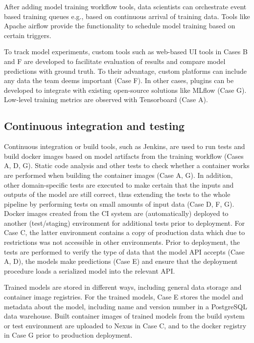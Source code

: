 
After adding model training workflow tools, data scientists can orchestrate event based training queues e.g., based on continuous arrival of training data.  Tools like Apache airflow provide the functionality to schedule model training based on certain triggers. %

To track model experiments, custom tools such as web-based UI tools in Cases B and F are developed to facilitate evaluation of results and compare model predictions with ground truth. To their advantage, custom platforms can include any data the team deems important (Case F). In other cases, plugins can be developed to integrate with existing open-source solutions like MLflow (Case G). Low-level training metrics are observed with Tensorboard (Case A).


\subsection{Continuous integration and testing}

Continuous integration or build tools, such as Jenkins, are used to run tests and build docker images based on model artifacts from the training workflow (Cases A, D, G). Static code analysis and other tests to check whether a container works are performed when building the container images (Case A, G). In addition, other domain-specific tests are executed to make certain that the inputs and outputs of the model are still correct, thus extending the tests to the whole pipeline by performing tests on small amounts of input data (Case D, F, G). Docker images created from the CI system are (automatically) deployed to another (test/staging) environment for additional tests prior to deployment. %
For Case C, the latter environment contains a copy of production data which due to restrictions was not accessible in other environments. Prior to deployment, the tests are performed to verify the type of data that the model API accepts (Case A, D), the models make predictions (Case E) and ensure that the deployment procedure loads a serialized model into the relevant API.

Trained models are stored in different ways, including general data storage and container image registries. For the trained models, Case E stores the model and metadata about the model, including name and version number in a PostgreSQL data warehouse. Built container images of trained models from the build system or test environment are uploaded to Nexus in Case C, and to the docker registry in Case G prior to production deployment. 

